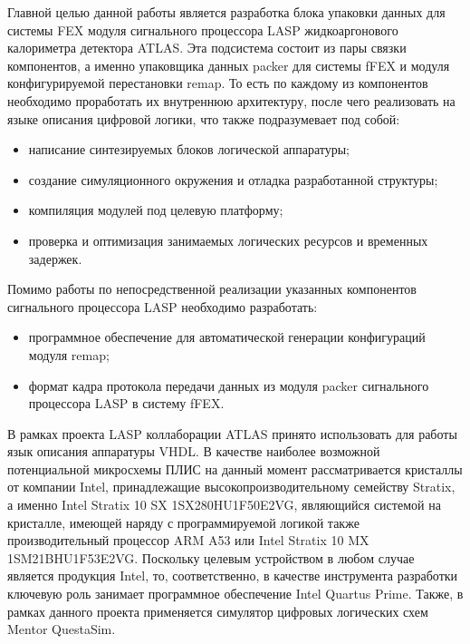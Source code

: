Главной целью данной работы является разработка блока упаковки данных для системы FEX модуля сигнального процессора LASP жидкоаргонового калориметра детектора ATLAS. Эта подсистема состоит из пары связки компонентов, а именно упаковщика данных packer для системы fFEX и  модуля конфигурируемой перестановки remap. То есть по каждому из компонентов необходимо проработать их внутреннюю архитектуру, после чего реализовать на языке описания цифровой логики, что также подразумевает под собой:\par
\begin{itemize}
    \item написание синтезируемых блоков логической аппаратуры;
    \item создание симуляционного окружения и отладка разработанной структуры;
    \item компиляция модулей под целевую платформу;
    \item проверка и оптимизация занимаемых логических ресурсов и временных задержек.
\end{itemize}\par
Помимо работы по непосредственной реализации указанных компонентов сигнального процессора LASP необходимо разработать:\par
\begin{itemize}
    \item программное обеспечение для автоматической генерации конфигураций модуля remap;
    \item формат кадра протокола передачи данных из модуля packer сигнального процессора LASP в систему fFEX.
\end{itemize}\par
В рамках проекта LASP коллаборации ATLAS принято использовать для работы язык описания аппаратуры VHDL. В качестве наиболее возможной потенциальной микросхемы ПЛИС на данный момент рассматривается кристаллы от компании Intel, принадлежащие высокопроизводительному семейству Stratix, а именно Intel Stratix 10 SX 1SX280HU1F50E2VG, являющийся системой на кристалле, имеющей наряду с программируемой логикой также производительный процессор ARM A53 или Intel Stratix 10 MX 1SM21BHU1F53E2VG. Поскольку целевым устройством в любом случае является продукция Intel, то, соответственно, в качестве инструмента разработки ключевую роль занимает программное обеспечение Intel Quartus Prime. Также, в рамках данного проекта применяется симулятор цифровых логических схем Mentor QuestaSim.\par
